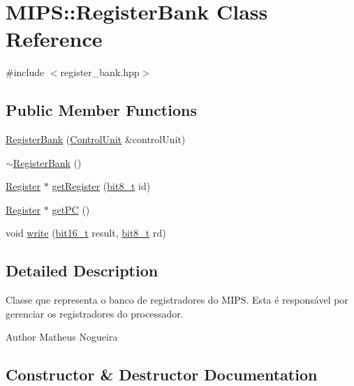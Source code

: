 \hypertarget{classMIPS_1_1RegisterBank}{}\section{M\+I\+PS\+:\+:Register\+Bank Class Reference}
\label{classMIPS_1_1RegisterBank}


{\ttfamily \#include $<$register\+\_\+bank.\+hpp$>$}

\subsection*{Public Member Functions}
\begin{DoxyCompactItemize}
\item 
\hyperlink{classMIPS_1_1RegisterBank_af1f4081a25776a54ef79bf9c4d23a27d}{Register\+Bank} (\hyperlink{classMIPS_1_1ControlUnit}{Control\+Unit} \&control\+Unit)
\item 
\hyperlink{classMIPS_1_1RegisterBank_ab86cb023791911b8f056870064d29245}{$\sim$\+Register\+Bank} ()
\item 
\hyperlink{classMIPS_1_1Register}{Register} $\ast$ \hyperlink{classMIPS_1_1RegisterBank_a6a7df1ec1d165a4d7273bde8caa94e45}{get\+Register} (\hyperlink{core_8hpp_a6074bae122ae7b527864eec42c728c3c}{bit8\+\_\+t} id)
\item 
\hyperlink{classMIPS_1_1Register}{Register} $\ast$ \hyperlink{classMIPS_1_1RegisterBank_a57fe0222f8176236f88f26e6a3af8ace}{get\+PC} ()
\item 
void \hyperlink{classMIPS_1_1RegisterBank_a4c6a18e903ee79d445988b92cadc3914}{write} (\hyperlink{core_8hpp_adc265a970bc35995b5879784bbb3f1b7}{bit16\+\_\+t} result, \hyperlink{core_8hpp_a6074bae122ae7b527864eec42c728c3c}{bit8\+\_\+t} rd)
\end{DoxyCompactItemize}


\subsection{Detailed Description}
Classe que representa o banco de registradores do M\+I\+PS. Esta é responsável por gerenciar os registradores do processador.

\begin{DoxyAuthor}{Author}
Matheus Nogueira 
\end{DoxyAuthor}


\subsection{Constructor \& Destructor Documentation}
